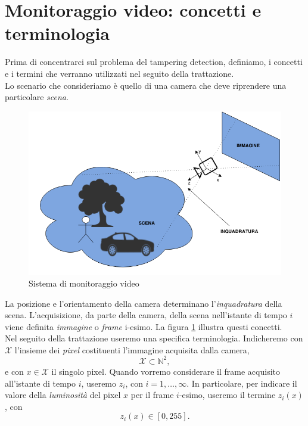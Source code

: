 \section{Monitoraggio video: concetti e terminologia}
Prima di concentrarci sul problema del tampering detection, definiamo, i concetti e i termini che verranno utilizzati nel seguito della trattazione.\\
Lo scenario che consideriamo \`e quello di una camera che deve riprendere una particolare \textit{\gls{scena}}.
\begin{figure}
	\centering
	\includegraphics[width=12cm]{./pictures/videoMonitoring}
	\caption{Sistema di monitoraggio video}
	\label{fig:videoMonitoring}
\end{figure}
\noindent 
La posizione e l'orientamento della camera determinano l'\textit{\gls{inquadratura}} della scena.
L'acquisizione, da parte della camera, della scena nell'istante di tempo $i$ viene definita \textit{immagine} o \textit{frame} i-esimo.
La figura \ref{fig:videoMonitoring} illustra questi concetti.\\
Nel seguito della trattazione useremo una specifica terminologia.
Indicheremo con $\mathcal{X}$ l'insieme dei \textit{pixel} costituenti l'immagine acquisita dalla camera,
\[ \mathcal{X} \subset \mathbb{N}^2, \]
e con $x \in \mathcal{X}$ il singolo pixel.
Quando vorremo considerare il frame acquisito all'istante di tempo $i$, useremo $z_i$, con $i=1,\dots , \infty$. 
In particolare, per indicare il valore della \textit{luminosit\`a} del pixel $x$ per il frame $i$-esimo, useremo il termine $z_i(x)$, con 
\[ z_i(x) \in [0, 255]. \]
